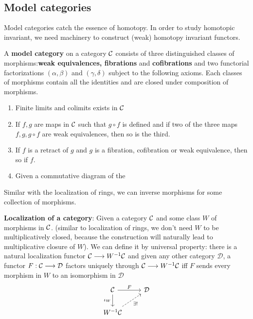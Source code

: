 \documentclass[11pt]{book} %
\begin{document}
\begin{proposition}
\section{Model categories}
Model categories catch the essence of homotopy. In order to study homotopic invariant, we need machinery to construct (weak) homotopy invariant functors.

\begin{definition}
A \textbf{model category} on a category ${\cal C}$ consists of three distinguished classes of morphisms:\textbf{weak equivalences, fibrations} and \textbf{cofibrations} and two functorial factorizations $(\alpha,\beta)$ and $(\gamma,\delta)$ subject to the following axioms. Each classes of morphisms contain all the identities and are closed under composition of morphisms.
\begin{enumerate}[label=MC\arabic*:]
\item Finite limits and colimits exists in ${\cal C}$
\item If $f,g$ are maps in ${\cal C}$ such that $g\circ f$ is defined and if two of the three maps $f,g,g\circ f$ are weak equivalences, then so is the third.
\item If $f$ is a retract of $g$ and $g$ is a fibration, cofibration or weak equivalence, then so if $f$.
\item Given a commutative diagram of the 
\end{enumerate} 
\end{definition}

Similar with the localization of rings, we can inverse morphisms for some collection of morphisms.
\begin{definition}\textbf{Localization of a category}:
Given a category ${\cal C}$ and some class $W$ of morphisms in ${\cal C}$. (similar to localization of rings, we don't need $W$ to be multiplicatively closed, because the construction will naturally lead to multiplicative closure of $W$). We can define it by universal property: there is a natural localization functor ${\cal C}\longrightarrow W^{-1}{\cal C}$ and given any other category $\mathcal{D}$, a functor $F:{\cal C}\longrightarrow\mathcal{D}$ factors uniquely through ${\cal C}\longrightarrow W^{-1}{\cal C}$ iff $F$ sends every morphism in $W$ to an isomorphism in $\mathcal{D}$
\[
\begin{tikzcd}
\calc \arrow[d, "\iota_W"'] \arrow[r, "F"] & \mathcal{D} \\
W^{-1}\calc \arrow[ru, "\exists!"', dashed] & 
\end{tikzcd}
\]
\end{definition}


\end{proposition}
\end{document}
